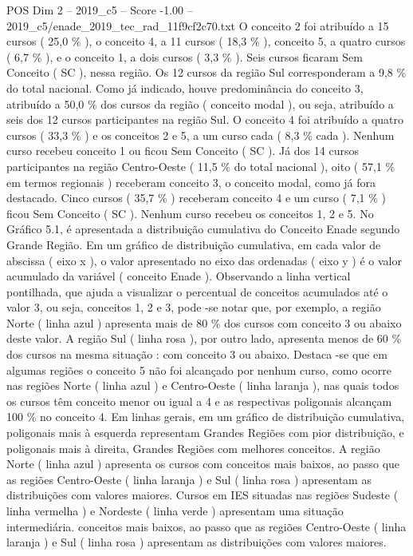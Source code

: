 \begin{textsample}{POS Dim 2 – 2019\_c5 – Score -1.00 – 2019\_c5/enade\_2019\_tec\_rad\_11f9cf2c70.txt}
O conceito 2 foi atribuído a 15 cursos ( 25,0 \% ), o conceito 4, a 11 cursos ( 18,3 \% ), conceito 5, a quatro cursos ( 6,7 \% ), e o conceito 1, a dois cursos ( 3,3 \% ).
Seis cursos ficaram Sem Conceito ( SC ), nessa região.
Os 12 cursos da região Sul corresponderam a 9,8 \% do total nacional.
Como já indicado, houve predominância do conceito 3, atribuído a 50,0 \% dos cursos da região ( conceito modal ), ou seja, atribuído a seis dos 12 cursos participantes na região Sul.
O conceito 4 foi atribuído a quatro cursos ( 33,3 \% ) e os conceitos 2 e 5, a um curso cada ( 8,3 \% cada ).
Nenhum curso recebeu conceito 1 ou ficou Sem Conceito ( SC ).
Já dos 14 cursos participantes na região Centro-Oeste ( 11,5 \% do total nacional ), oito ( 57,1 \% em termos regionais ) receberam conceito 3, o conceito modal, como já fora destacado.
Cinco cursos ( 35,7 \% ) receberam conceito 4 e um curso ( 7,1 \% ) ficou Sem Conceito ( SC ).
Nenhum curso recebeu os conceitos 1, 2 e 5.
No Gráfico 5.1, é apresentada a distribuição cumulativa do Conceito Enade segundo Grande Região.
Em um gráfico de distribuição cumulativa, em cada valor de abscissa ( eixo x ), o valor apresentado no eixo das ordenadas ( eixo y ) é o valor acumulado da variável ( conceito Enade ).
Observando a linha vertical pontilhada, que ajuda a visualizar o percentual de conceitos acumulados até o valor 3, ou seja, conceitos 1, 2 e 3, pode -se notar que, por exemplo, a região Norte ( linha azul ) apresenta mais de 80 \% dos cursos com conceito 3 ou abaixo deste valor.
A região Sul ( linha rosa ), por outro lado, apresenta menos de 60 \% dos cursos na mesma situação : com conceito 3 ou abaixo.
Destaca -se que em algumas regiões o conceito 5 não foi alcançado por nenhum curso, como ocorre nas regiões Norte ( linha azul ) e Centro-Oeste ( linha laranja ), nas quais todos os cursos têm conceito menor ou igual a 4 e as respectivas poligonais alcançam 100 \% no conceito 4.
Em linhas gerais, em um gráfico de distribuição cumulativa, poligonais mais à esquerda representam Grandes Regiões com pior distribuição, e poligonais mais à direita, Grandes Regiões com melhores conceitos.
A região Norte ( linha azul ) apresenta os cursos com conceitos mais baixos, ao passo que as regiões Centro-Oeste ( linha laranja ) e Sul ( linha rosa ) apresentam as distribuições com valores maiores.
Cursos em IES situadas nas regiões Sudeste ( linha vermelha ) e Nordeste ( linha verde ) apresentam uma situação intermediária. conceitos mais baixos, ao passo que as regiões Centro-Oeste ( linha laranja ) e Sul ( linha rosa ) apresentam as distribuições com valores maiores.

\end{textsample}
